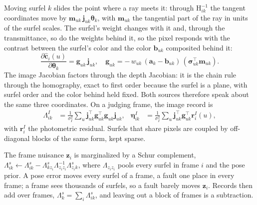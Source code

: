  Moving surfel $k$ slides the point where a ray meets it: through
$\mathrm H_{ik}^{-1}$ the tangent coordinates move by $\mathbf m_{uk}\,\mathbf j_{uk}\boldsymbol\theta_k$,
with $\mathbf m_{uk}$ the tangential part of the ray in units of the surfel scales. The surfel's weight
changes with it and, through the transmittance, so do the weights behind it, so the pixel responds with
the contrast between the surfel's color and the color $\mathbf b_{uk}$ composited behind it:
\begin{equation}
\frac{\partial\hat{\mathbf c}_i(u)}{\partial\boldsymbol\theta_k}=\mathbf g_{uk}\,\mathbf j_{uk},\quad
\mathbf g_{uk}=-\,w_{uk}\,(\mathbf a_k-\mathbf b_{uk})\,(\boldsymbol\sigma_{uk}^{\top}\mathbf m_{uk}).
\label{eq:factor}
\end{equation}
The image Jacobian factors through the depth Jacobian: it is the chain rule through the homography, exact
to first order because the surfel is a plane, with surfel order and the color behind held fixed. Both
sources therefore speak about the same three coordinates. On a judging frame, the image record is
\begin{align}
\Lambda^{I}_{ik}&=\frac{1}{\sigma_I^{2}}\sum_{u}\mathbf j_{uk}^{\top}\mathbf g_{uk}^{\top}\mathbf g_{uk}\mathbf j_{uk},&
\boldsymbol\eta^{I}_{ik}&=\frac{1}{\sigma_I^{2}}\sum_{u}\mathbf j_{uk}^{\top}\mathbf g_{uk}^{\top}\mathbf r^{I}_i(u),
\label{eq:imagerecord}
\end{align}
with $\mathbf r^{I}_i$ the photometric residual. Surfels that share pixels are coupled by off-diagonal
blocks of the same form, kept sparse.

 The frame nuisance $\mathbf z_i$ is marginalized by a Schur complement,
$\Lambda^{s}_{ik}\leftarrow\Lambda^{s}_{ik}-\Lambda^{s}_{k z_i}\Lambda_{z_iz_i}^{-1}\Lambda^{s}_{z_i k}$,
where $\Lambda_{z_iz_i}$ pools every surfel in frame $i$ and the pose prior. A pose error moves every
surfel of a frame, a fault one place in every frame; a frame sees thousands of surfels, so a fault
barely moves $\mathbf z_i$. Records then add over frames, $\Lambda^{s}_{k}=\sum_i\Lambda^{s}_{ik}$, and leaving
out a block of frames is a subtraction.

